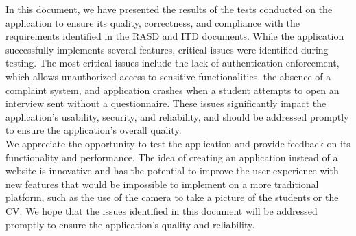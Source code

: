 In this document, we have presented the results of the tests conducted on the application to ensure its quality, correctness, and compliance with the requirements identified in the RASD and ITD documents. While the application successfully implements several features, critical issues were identified during testing. 
The most critical issues include the lack of authentication enforcement, which allows unauthorized access to sensitive functionalities, the absence of a complaint system, and application crashes when a student attempts to open an interview sent without a questionnaire. These issues significantly impact the application's usability, security, and reliability, and should be addressed promptly to ensure the application's overall quality.\\
We appreciate the opportunity to test the application and provide feedback on its functionality and performance. The idea of creating an application instead of a website is innovative and has the potential to improve the user experience with new features that would be impossible to implement on a more traditional platform, such as the use of the camera to take a picture of the students or the CV. We hope that the issues identified in this document will be addressed promptly to ensure the application's quality and reliability.\\